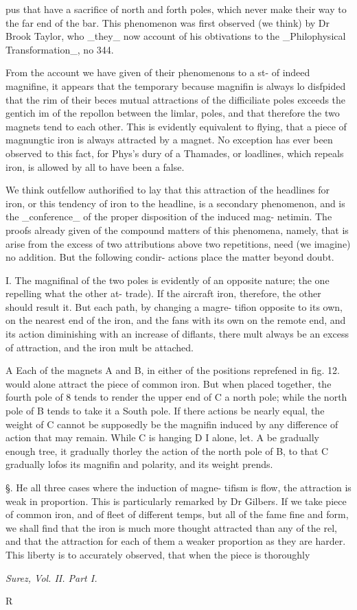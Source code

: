 pus that have a sacrifice of north and forth poles,
which never make their way to the far end of the bar.
This phenomenon was first observed (we think) by Dr
Brook Taylor, who \_they\_ now account of his obtivations
to the \_Philophysical Transformation\_, no 344.\par\medskip
From the account we have given of their phenomenons to a st-
of indeed magnifine, it appears that the temporary because
magnifin is always lo disfpided that the rim of their beces
mutual attractions of the difficiliate poles exceeds the
gentich
im of the repollon between the limlar, poles, and
that therefore the two magnets tend to each other.
This is evidently equivalent to flying, that a piece of
magnungtic iron is always attracted by a magnet. No
exception has ever been observed to this fact, for Phys's
dury of a Thamades, or loadlines, which repeals iron, is
allowed by all to have been a false.\par\medskip
We think outfellow authorified to lay that this attraction
of the headlines for iron, or this tendency of iron
to the headline, is a secondary phenomenon, and is the
\_conference\_ of the proper disposition of the induced mag-
netimin. The proofs already given of the compound
matters of this phenomena, namely, that is arise from
the excess of two attributions above two repetitions, need
(we imagine) no addition. But the following condir-
actions place the matter beyond doubt.\par\medskip
I. The magnifinal of the two poles is evidently of an
opposite nature; the one repelling what the other at-
trade). If the aircraft iron, therefore, the other
should result it. But each path, by changing a magre-
tifion opposite to its own, on the nearest end of the iron,
and the fans with its own on the remote end, and its
action diminishing with an increase of diflants, there
mult always be an excess of attraction, and the iron mult
be attached.\par\medskip
A Each of the magnets A and B, in either of the
positions reprefened in fig. 12. would alone attract the
piece of common iron. But when placed together,
the fourth pole of 8 tends to render the upper end of
C a north pole; while the north pole of B tends to
take it a South pole. If there actions be nearly equal,
the weight of C cannot be supposedly be the magnifin
induced by any difference of action that may remain.
While C is hanging D I alone, let. A be gradually
enough tree, it gradually thorley the action of the
north pole of B, to that C gradually lofos its magnifin
and polarity, and its weight prends.\par\medskip
§. He all three cases where the induction of magne-
tifism is flow, the attraction is weak in proportion. This
is particularly remarked by Dr Gilbers. If we take
piece of common iron, and of fleet of different temps,
but all of the fame fine and form, we shall find that the
iron is much more thought attracted than any of the
rel, and that the attraction for each of them a weaker
proportion as they are harder. This liberty is to
accurately observed, that when the piece is thoroughly\par\medskip
{\small\itshape Surez, Vol. II. Part I.\par}\medskip
R\par\medskip
